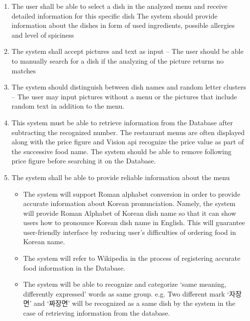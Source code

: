 \begin{enumerate}[label=A.\arabic*]
\item The user shall be able to select a dish in the analyzed menu and receive detailed information for this specific dish
The system should provide information about the dishes in form of used ingredients, possible allergies and level of spiciness
\item The system shall accept pictures and text as input – The user should be able to manually search for a dish if the analyzing of the picture returns no matches
\item The system should distinguish between dish names and random letter clusters – The user may input pictures without a menu or the pictures that include random text in addition to the menu.
\item This system must be able to retrieve information from the Database after subtracting the recognized number. The restaurant menus are often displayed along with the price figure and Vision api recognize the price value as part of the successive food name. The system should be able to remove following price figure before searching it on the Database.
\item The system shall be able to provide reliable information about the menu 
    \begin{itemize}
    \item The system will support Roman alphabet conversion in order to provide accurate information about Korean pronunciation. 
Namely, the system will provide Roman Alphabet of Korean dish name so that it can show users how to pronounce Korean dish name in English. This will guarantee user-friendly interface by reducing user’s difficulties of ordering food in Korean name.
    \item The system will refer to Wikipedia in the process of registering accurate food information in the Database.  
    \item  The system will be able to recognize and categorize ‘same meaning, differently expressed’ words as same group. 
e.g. Two different mark ‘자장면’ and ‘짜장면’ will be recognized as a same dish by the system in the case of retrieving information from the database.

    \end{itemize}
\end{enumerate}

